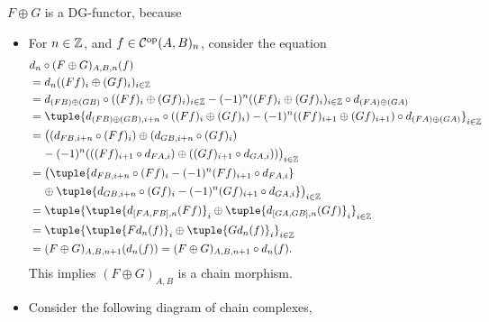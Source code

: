 \begin{remark}
    \( F \oplus G \) is a DG-functor, because
    \begin{itemize}
        \item {
            For \( n \in {\mathbb{Z}} \), and \( f \in {\mathcal{C}}^{\operatorname{op}}(A, B)_n \), consider the equation
            \begin{align*}
                &d_n \circ (F \oplus G)_{A, B, n} (f) \\
                &= d_n ((F f)_i \oplus (G f)_i)_{i \in \Zb} \\
                &= d_{(F B) \oplus (G B)} \circ ((F f)_i \oplus (G f)_i)_{i \in \Zb} - (-1)^n ((F f)_i \oplus (G f)_i)_{i \in \Zb} \circ d_{(F A) \oplus (G A)} \\
                &= \tuple{d_{(F B) \oplus (G B), i + n} \circ ((F f)_i \oplus (G f)_i) - (-1)^n ((F f)_{i + 1} \oplus (G f)_{i + 1}) \circ d_{(F A) \oplus (G A)}}_{i \in \Zb} \\
                &= \big( (d_{F B, i + n} \circ (F f)_i) \oplus (d_{G B, i + n} \circ (G f)_i) \\
                &\hspace{0.4cm} - (-1)^n ( ( (F f)_{i + 1} \circ d_{F A, i} ) \oplus ( (G f)_{i + 1} \circ d_{G A, i} ) ) \big)_{i \in \Zb} \\
                &= \big( \tuple{d_{F B, i + n} \circ (F f)_i - (-1)^n (F f)_{i + 1} \circ d_{F A, i}} \\
                &\hspace{0.4cm} \oplus \tuple{d_{G B, i + n} \circ (G f)_i - (-1)^n (G f)_{i + 1} \circ d_{G A, i}} \big)_{i \in \Zb} \\
                &= \tuple{ \tuple{d_{[F A, F B], n} (F f)}_i \oplus \tuple{ d_{[G A, G B], n} (G f)}_i }_{i \in \Zb} \\
                &= \tuple{ \tuple{F d_n (f)}_i \oplus \tuple{ G d_n (f)}_i }_{i \in \Zb} \\
                &= (F \oplus G)_{A, B, n + 1} (d_n (f)) = (F \oplus G)_{A, B, n + 1} \circ d_n (f).
            \end{align*}
            This implies \( (F \oplus G)_{A, B} \) is a chain morphism.
        }
        \item {
            Consider the following diagram of chain complexes,
            \begin{center}
\end{center}}
\end{itemize}
\end{remark}
